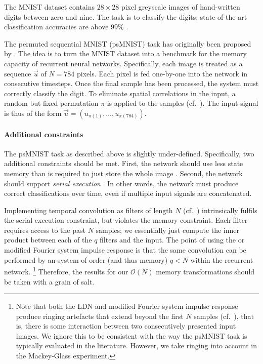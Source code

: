 The MNIST dataset \citep{lecun1998gradientbased} contains $28 \times 28$ pixel greyscale images of hand-written digits between zero and nine.
The task is to classify the digits; state-of-the-art classification accuracies are above $99\%$ \citep{baldominos2019survey}.

The permuted sequential MNIST (psMNIST) task has originally been proposed by \citet{le2015simple}.
The idea is to turn the MNIST dataset into a benchmark for the memory capacity of recurrent neural networks.
Specifically, each image is treated as a sequence $\vec u$ of $N = 784$ pixels.
Each pixel is fed one-by-one into the network in consecutive timesteps.
Once the final sample has been processed, the system must correctly classify the digit.
To eliminate spatial correlations in the input, a random but fixed permutation $\pi$ is applied to the samples (cf.~).
The input signal is thus of the form $\vec u = (u_{\pi(1)}, \ldots, u_{\pi(784)})$.

\paragraph{Additional constraints}
The psMNIST task as described above is slightly under-defined.
Specifically, two additional constraints should be met.
First, the network should use less state memory than is required to just store the whole image \citep{voelker2019lmu}.
Second, the network should support \emph{serial execution} \citep{chandar2019nonsaturating}.
In other words, the network must produce correct classifications over time, even if multiple input signals are concatenated.

Implementing temporal convolution as \FIR filters of length $N$ (cf.~) intrinsically fulfils the serial execution constraint, but violates the memory constraint.
Each filter requires access to the past $N$ samples; we essentially just compute the inner product between each of the $q$ \FIR filters and the input.
The point of using the \LDN or modified Fourier system impulse response is that the same convolution can be performed by an \LTI system of order (and thus memory) $q < N$ within the recurrent \LRGF \LMU network.%
\footnote{Note that both the LDN and modified Fourier system impulse response produce ringing artefacts that extend beyond the first $N$ samples (cf.~), that is, there is some interaction between two consecutively presented input images.
We ignore this to be consistent with the way the psMNIST task is typically evaluated in the literature.
However, we take ringing into account in the Mackey-Glass experiment.}
Therefore, the results for our $\mathcal{O}(N)$ memory transformations should be taken with a grain of salt.

